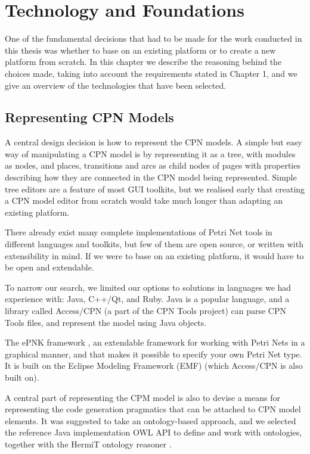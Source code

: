\chapter{Technology and Foundations}
\label{chap:technology}

One of the fundamental decisions that had to be made for the work conducted
in this thesis was whether to base \thename{} on an existing platform or to
create a new platform from scratch. In this chapter we describe the
reasoning behind the choices made, taking into account the requirements stated
in Chapter 1, and we give an overview of the technologies that have been
selected.

\section{Representing CPN Models}
	
	A central design decision is how to represent the CPN models. A simple
	but easy way of manipulating a CPN model is by representing it as a tree, with
	modules as nodes, and places, transitions and arcs as child nodes of pages with
	properties describing how they are connected in the CPN model being
	represented. Simple tree editors are a feature of most GUI toolkits,
	but we realised early that creating a CPN model editor from scratch would take
	much longer than adapting an existing platform.

	There already exist many complete implementations of Petri Net tools in
	different languages and toolkits, but few of them are open source, or written
	with extensibility in mind. If we were to base \thename{} on an existing
	platform, it would have to be open and extendable. 
	
	To narrow our search, we limited our options to solutions in
	languages we had experience with: Java, C++/Qt, and Ruby. Java is a popular
	language, and a library called Access/CPN \cite{accesscpn} (a part of the CPN
	Tools project) can parse CPN Tools files, and represent the model using Java
	objects.
	
	The ePNK framework \cite{kindler2011epnk}, an extendable framework for working
	with Petri Nets in a graphical manner, and that makes it possible to specify
	your own Petri Net type. It is built on the Eclipse Modeling Framework (EMF)
	\cite{steinberg2008emf} (which Access/CPN is also built on). 

	A central part of representing the CPM model is also to devise a means for
	representing the code generation pragmatics that can be attached to CPN model
	elements. It was suggested to take an ontology-based approach, and we selected
	the reference Java implementation OWL API \cite{horridge2009owl} to define and work
	with ontologies, together with the HermiT ontology reasoner
	\cite{shearer2008hermit}.
	
